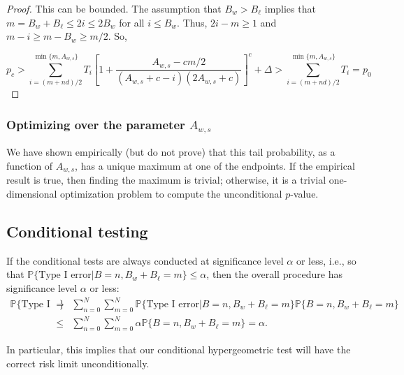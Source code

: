 \begin{proof}
This can be bounded.
The assumption that $B_w > B_\ell$ implies that $m = B_w+B_\ell \leq 2i \leq 2B_w$ for all $i \leq B_w$.
Thus, $2i-m \geq 1$ and $m-i \geq m-B_w \geq m/2$.
So,

$$p_c > \sum_{i = (m+nd)/2}^{\min\{m, A_{w,s}\}} T_i \left[ 1 + \frac{A_{w,s} - cm/2}{(A_{w,s} + c - i)(2A_{w,s}+c)} \right]^c + \Delta >  \sum_{i = (m+nd)/2}^{\min\{m, A_{w,s}\}} T_i  = p_0$$





\end{proof}


\subsubsection{Optimizing over the parameter $A_{w,s}$}

We have shown empirically (but do not prove) that this tail probability, as a function of $A_{w,s}$,
has a unique maximum at one of the endpoints.
If the empirical result is true, then finding the maximum is trivial;
otherwise, it is a trivial one-dimensional optimization problem to compute the unconditional $p$-value.

\subsection{Conditional testing}
If the conditional tests are always conducted at significance level $\alpha$ or less, i.e., so that
$\mathbb{P} \{\mbox{Type I error} | B = n, B_w+B_\ell = m\} \le \alpha$, then the
overall procedure has significance level $\alpha$ or less:
\begin{eqnarray}
    \mathbb{P} \{\mbox{Type I error}\} &=& \sum_{n=0}^N\sum_{m=0}^{N} \mathbb{P} \{\mbox{Type I error} |  B = n, B_w+B_\ell = m\} \mathbb{P} \{ B = n, B_w+B_\ell = m \} \nonumber \\
       & \le & \sum_{n=0}^N\sum_{m=0}^{N}  \alpha \mathbb{P} \{  B = n, B_w+B_\ell = m \}  =  \alpha.
\end{eqnarray}

In particular, this implies that our conditional hypergeometric test will have the correct risk limit unconditionally.
